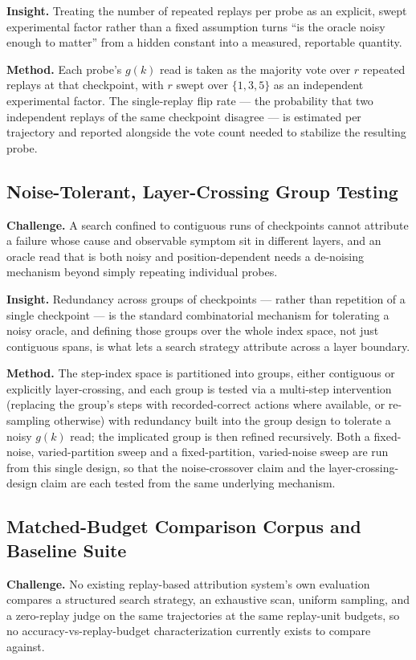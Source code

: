 \documentclass[11pt]{article}
\begin{document}
\textbf{Insight.} Treating the number of repeated replays per probe as an explicit, swept experimental factor rather than a fixed assumption turns ``is the oracle noisy enough to matter'' from a hidden constant into a measured, reportable quantity.

\textbf{Method.} Each probe's $g(k)$ read is taken as the majority vote over $r$ repeated replays at that checkpoint, with $r$ swept over $\{1,3,5\}$ as an independent experimental factor. The single-replay flip rate --- the probability that two independent replays of the same checkpoint disagree --- is estimated per trajectory and reported alongside the vote count needed to stabilize the resulting probe.

\subsection{Noise-Tolerant, Layer-Crossing Group Testing}
\textbf{Challenge.} A search confined to contiguous runs of checkpoints cannot attribute a failure whose cause and observable symptom sit in different layers, and an oracle read that is both noisy and position-dependent needs a de-noising mechanism beyond simply repeating individual probes.

\textbf{Insight.} Redundancy across groups of checkpoints --- rather than repetition of a single checkpoint --- is the standard combinatorial mechanism for tolerating a noisy oracle, and defining those groups over the whole index space, not just contiguous spans, is what lets a search strategy attribute across a layer boundary.

\textbf{Method.} The step-index space is partitioned into groups, either contiguous or explicitly layer-crossing, and each group is tested via a multi-step intervention (replacing the group's steps with recorded-correct actions where available, or re-sampling otherwise) with redundancy built into the group design to tolerate a noisy $g(k)$ read; the implicated group is then refined recursively. Both a fixed-noise, varied-partition sweep and a fixed-partition, varied-noise sweep are run from this single design, so that the noise-crossover claim and the layer-crossing-design claim are each tested from the same underlying mechanism.

\subsection{Matched-Budget Comparison Corpus and Baseline Suite}
\textbf{Challenge.} No existing replay-based attribution system's own evaluation compares a structured search strategy, an exhaustive scan, uniform sampling, and a zero-replay judge on the same trajectories at the same replay-unit budgets, so no accuracy-vs-replay-budget characterization currently exists to compare against.
\end{document}
